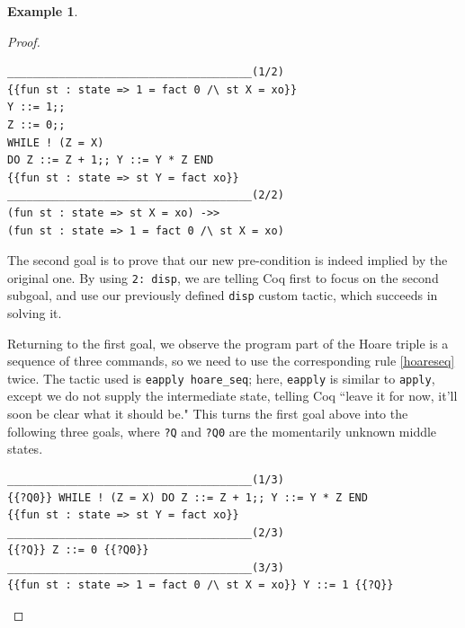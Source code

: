 \documentclass[12pt,notitlepage]{report}
\theoremstyle{plain}
\theoremstyle{definition}
\newtheorem{example}[theo]{Example}
\numberwithin{equation}{section}
\begin{document}
\begin{example}
\begin{proof}
    \begin{verbatim}
______________________________________(1/2)
{{fun st : state => 1 = fact 0 /\ st X = xo}}
Y ::= 1;;
Z ::= 0;;
WHILE ! (Z = X)
DO Z ::= Z + 1;; Y ::= Y * Z END
{{fun st : state => st Y = fact xo}}
______________________________________(2/2)
(fun st : state => st X = xo) ->>
(fun st : state => 1 = fact 0 /\ st X = xo)
    \end{verbatim}
    The second goal is to prove that our new pre-condition is indeed implied by the original one.  By using \verb$2: disp$, we are telling Coq first to focus on the second subgoal, and use our previously defined \verb$disp$ custom tactic, which succeeds in solving it.
    \par Returning to the first goal, we observe the program part of the Hoare triple is a sequence of three commands, so we need to use the corresponding rule \eqref{hoareseq} twice.  The tactic used is \verb$eapply hoare_seq$; here, \verb$eapply$ is similar to \verb$apply$, except we do not supply the intermediate state, telling Coq ``leave it for now, it'll soon be clear what it should be."  This turns the first goal above into the following three goals, where \verb$?Q$ and \verb$?Q0$ are the momentarily unknown middle states.
    \begin{verbatim}
______________________________________(1/3)
{{?Q0}} WHILE ! (Z = X) DO Z ::= Z + 1;; Y ::= Y * Z END
{{fun st : state => st Y = fact xo}}
______________________________________(2/3)
{{?Q}} Z ::= 0 {{?Q0}}
______________________________________(3/3)
{{fun st : state => 1 = fact 0 /\ st X = xo}} Y ::= 1 {{?Q}}
    \end{verbatim}
 

\end{proof}
\end{example}
\end{document}
